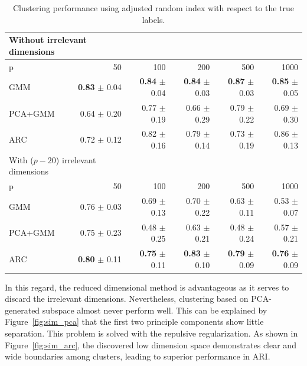 \documentclass[12pt]{article}
\begin{document}
\begin{table}[H]
\small
\centering
	\begin{tabular}{| l | r | r| r| r| r| }
			\multicolumn{2}{l}{Without irrelevant dimensions} \\
	\hline
			p & 50 & 100 & 200 & 500 &1000  \\
	\hline
			GMM &   {\bf 0.83} $\pm$ 0.04 &  {\bf 0.84} $\pm$ 0.04  &  {\bf 0.84} $\pm$ 0.03 &  {\bf 0.87} $\pm$ 0.03 &  {\bf 0.85} $\pm$ 0.05 \\
			PCA+GMM		& 0.64 $\pm$ 0.20 & 0.77 $\pm$ 0.19 & 0.66 $\pm$ 0.29 & 0.79 $\pm$ 0.22 & 0.69 $\pm$ 0.30\\
			ARC 	&  0.72 $\pm$ 0.12 & 0.82 $\pm$ 0.16 & 0.79 $\pm$ 0.14 & 0.73 $\pm$ 0.19 & 0.86 $\pm$ 0.13\\
			\hline
			\multicolumn{2}{l}{With ($p-20$) irrelevant dimensions } \\
	\hline
			p & 50 & 100 & 200 & 500 &1000  \\
	\hline
			GMM & 0.76 $\pm$ 0.03  &  0.69 $\pm$ 0.13     &  0.70 $\pm$ 0.22  &  0.63 $\pm$ 0.11 &  0.53 $\pm$ 0.07\\
			PCA+GMM	&0.75 $\pm$ 0.23 	& 0.48 $\pm$ 0.25  &  0.63 $\pm$ 0.21   &  0.48 $\pm$ 0.24&   0.57 $\pm$ 0.21\\
			ARC 	& {\bf 0.80} $\pm$ 0.11  & {\bf 0.75} $\pm$ 0.11 &  {\bf 0.83 } $\pm$ 0.10   &  {\bf 0.79} $\pm$ 0.09&  {\bf 0.76} $\pm$ 0.09\\
			\hline
	\end{tabular}
	\caption{Clustering performance using adjusted random index with respect to the true labels.}
	\label{tabs1}
\end{table}

In this regard, the reduced dimensional method is advantageous as it serves to discard the irrelevant dimensions. Nevertheless, clustering based on PCA-generated subspace almost never perform well. This can be explained by Figure~\ref{fig:sim_pca} that the first two principle components show little separation. This problem is solved with the repulsive regularization. As shown in  Figure~\ref{fig:sim_arc}, the discovered low dimension space demonstrates clear and wide boundaries among clusters, leading to superior performance in ARI. 
\end{document}
